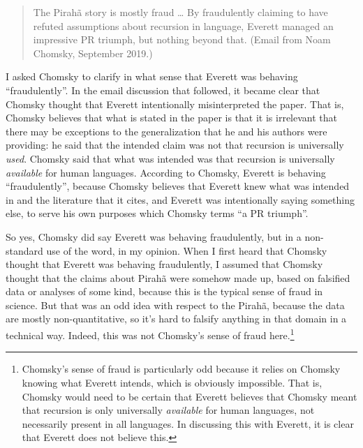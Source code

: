 \documentclass[output=paper]{langscibook}
\begin{document}
\begin{quote}
    The Pirahã story is mostly fraud \ldots{}  By fraudulently claiming to have refuted assumptions about recursion in language, Everett managed an impressive PR triumph, but nothing beyond that. (Email from Noam Chomsky, September 2019.)
\end{quote}

I asked Chomsky to clarify in what sense that Everett was behaving ``fraudulently''. In the email discussion that followed, it became clear that Chomsky thought that Everett intentionally misinterpreted the \citet{hauser2002faculty} paper.  That is, Chomsky believes that what is stated in the \citet{hauser2002faculty} paper is that it is irrelevant that there may be exceptions to the generalization that he and his authors were providing: he said that the intended claim was not that recursion is universally \textit{used}. Chomsky said that what was intended was that recursion is universally \textit{available} for human languages. According to Chomsky, Everett is behaving ``fraudulently'', because Chomsky believes that Everett knew what was intended in \citet{hauser2002faculty} and the literature that it cites, and Everett was intentionally saying something else, to serve his own purposes which Chomsky terms ``a PR triumph''. 

\begin{sloppypar}
So yes, Chomsky did say Everett was behaving fraudulently, but in a non-standard use of the word, in my opinion. When I first heard that Chomsky thought that Everett was behaving fraudulently, I assumed that Chomsky thought that the claims about Pirahã were somehow made up, based on falsified data or analyses of some kind, because this is the typical sense of fraud in science.  But that was an odd idea with respect to the Pirahã, because the data are mostly non-quantitative, so it's hard to falsify anything in that domain in a technical way. Indeed, this was not Chomsky's sense of fraud here.\footnote{Chomsky's sense of fraud is particularly odd because it relies on Chomsky knowing what Everett intends, which is obviously impossible. That is, Chomsky would need to be certain that Everett believes that Chomsky meant that recursion is only universally \textit{available} for human languages, not necessarily present in all languages. In discussing this with Everett, it is clear that Everett does not believe this.}
\end{sloppypar}
\end{document}
